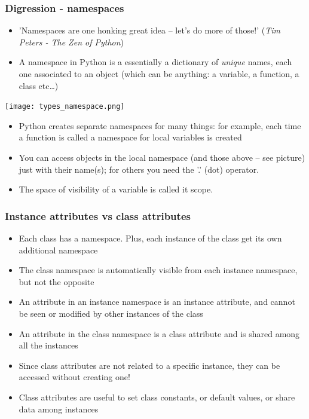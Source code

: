 \documentclass[9pt]{beamer}
\begin{document}
\begin{frame}
  \frametitle{Digression - namespaces}

  \begin{itemize}
    \small
    \item 'Namespaces are one honking great idea -- let's do more of those!'
            (\emph{Tim Peters - The Zen of Python})
    \medskip
    \item A \alert{namespace} in Python is a essentially a dictionary of \emph{unique} names, each one associated to an object (which can be anything: a variable, a function, a class etc\dots)
    \medskip
  \end{itemize}

  \centering\texttt{[image: types\_namespace.png]}

  \begin{itemize}
    \small
    \item Python creates separate namespaces for many things: for example, each time a function is called a namespace for local variables is created
    \medskip
    \item You can access objects in the local namespace (and those above --
          see picture) just with their name(s); for others you need
          the '.' (dot) operator.
    \medskip
    \item The space of visibility of a variable is called it \alert{scope}.
  \end{itemize}

\end{frame}


\begin{frame}
  \frametitle{Instance attributes vs class attributes}

  \begin{itemize}
    \small
    \item Each class has a namespace. Plus, each instance of the class get its own additional namespace
    \medskip
    \item The class namespace is automatically visible from each instance namespace, but not the opposite
    \medskip
    \item An attribute in an instance namespace is an \alert{instance attribute}, and cannot be seen or modified
          by other instances of the class
    \medskip
    \item An attribute in the class namespace is a \alert{class attribute} and is shared among all the instances
    \medskip
    \item Since class attributes are not related to a specific instance, they can be accessed without creating one!
    \medskip
    \item Class attributes are useful to set class constants, or default values, or share data among instances
  \end{itemize}

\end{frame}
\end{document}
